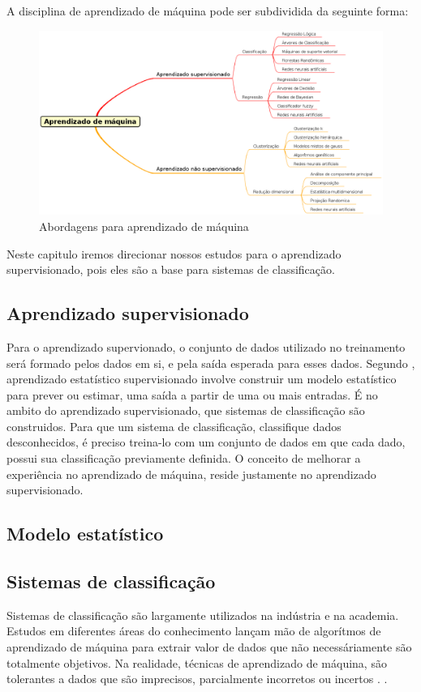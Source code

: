A disciplina de aprendizado de máquina pode ser subdividida da seguinte forma:
\begin{figure}[h]
	\centering
	\label{fig01}
        \includegraphics[scale=0.33]{figuras/mind1.eps}
	\caption{Abordagens para aprendizado de máquina}
\end{figure}
Neste capitulo iremos direcionar nossos estudos para o aprendizado supervisionado, pois eles são a base para sistemas de classificação.

\subsection{Aprendizado supervisionado}
Para o aprendizado supervionado, o conjunto de dados utilizado no treinamento será formado pelos dados em si, e pela saída esperada para esses dados\cite{Louridas}. Segundo \cite{James}, aprendizado estatístico supervisionado involve construir um modelo estatístico para prever ou estimar, uma saída a partir de uma ou mais entradas.  É no ambito do aprendizado supervisionado,
que sistemas de classificação são construidos. Para que um sistema de classificação, classifique dados desconhecidos, é preciso treina-lo com um conjunto de dados em que cada dado, possui sua classificação previamente definida.
O conceito de melhorar a experiência no aprendizado de máquina, reside justamente no aprendizado supervisionado.

\subsection{Modelo estatístico}

\subsection{Sistemas de classificação}
Sistemas de classificação são largamente utilizados na indústria e na academia. Estudos em diferentes áreas do conhecimento
lançam mão de algorítmos de aprendizado de máquina para extrair valor de dados que não necessáriamente são totalmente objetivos. Na realidade,
técnicas de aprendizado de máquina, são tolerantes a dados que são imprecisos, parcialmente incorretos ou incertos \cite{Malhotra}. .


